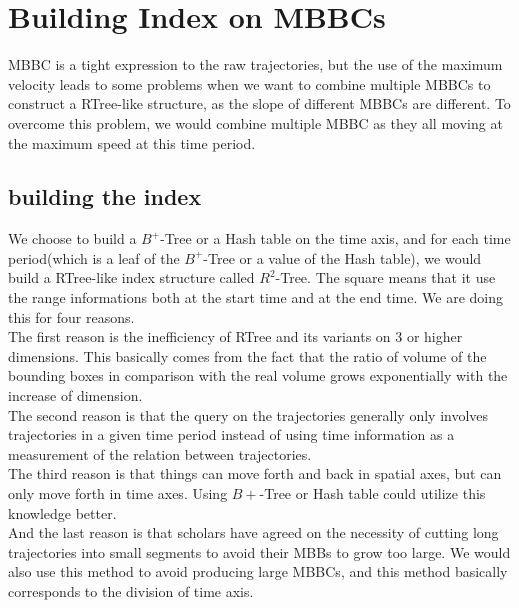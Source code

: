 \documentclass[sigplan]{acmart}
\begin{document}
\section{Building Index on MBBCs}
MBBC is a tight expression to the raw trajectories, but the use of the maximum velocity leads to some problems when we want to combine multiple MBBCs to construct a RTree-like structure, as the slope of different MBBCs are different. To overcome this problem, we would combine multiple MBBC as they all moving at the maximum speed at this time period.\par
\subsection{building the index}
We choose to build a $B^+$-Tree or a Hash table on the time axis, and for each time period(which is a leaf of the $B^+$-Tree or a value of the Hash table), we would build a RTree-like index structure called $R^2$-Tree. The square means that it use the range informations both at the start time and at the end time. We are doing this for four reasons.\\
\indent The first reason is the inefficiency of RTree and its variants on 3 or higher dimensions. This basically comes from the fact that the ratio of volume of the bounding boxes in comparison with the real volume grows exponentially with the increase of dimension.\\
\indent The second reason is that the query on the trajectories generally only involves trajectories in a given time period instead of using time information as a measurement of the relation between trajectories.\\
\indent The third reason is that things can move forth and back in spatial axes, but can only move forth in time axes. Using $B+$-Tree or Hash table could utilize this knowledge better.\\
\indent And the last reason is that scholars have agreed on the necessity of cutting long trajectories into small segments to avoid their MBBs to grow too large. We would also use this method to avoid producing large MBBCs, and this method basically corresponds to the division of time axis.\par
\end{document}
